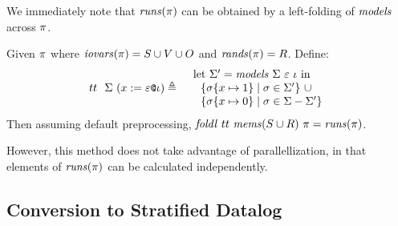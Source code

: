 We immediately note that $\mathit{runs}(\pi)$ can be obtained by a left-folding
of $\mathit{models}$ across $\pi$. 
\begin{lemma}
  \label{lemma-cruns}
  Given $\pi$ where $\mathit{iovars}(\pi) = S \cup V \cup O$ and $\mathit{rands}(\pi) = R$. Define:
  \begin{eqnarray*}
    {tt}\ \ \stores\ (\xassign{x}{\be}{\cid}) &\defeq& \begin{array}{l}
      \mathrm{let}\ \stores' = \solve{\stores}{\be}{\cid}\ \mathrm{in}\\
      \ \ \{\extend{\store}{x}{1} \mid \store \in \stores' \}\ \cup\\
      \ \ \{\extend{\store}{x}{0} \mid \store \in \stores - \stores' \}\end{array}%
  \end{eqnarray*}
  Then assuming default preprocessing, $\mathit{foldl}\ {tt}\ \mathit{mems}(S \cup R)\ \pi = \mathit{runs}(\pi)$.
\end{lemma}
However, this method does not take advantage of parallellization,
in that elements of $\mathit{runs}(\pi)$ can be calculated independently.

\subsection{Conversion to Stratified Datalog}

